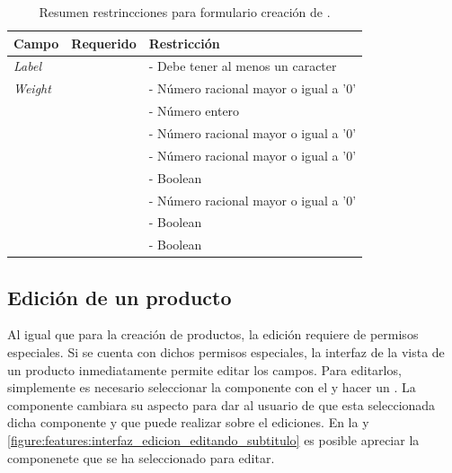 		\begin{table}[H] 
		    \centering
			\begin{tabular}{ |l|c||l| }
				\hline Campo & Requerido & Restricción \\ \hline
				\multirow{1}{*}{\textit{Label}}		&  \multirow{1}{*}{\checkmark} 	& - Debe tener al menos un caracter \\ \hline
				\multirow{1}{*}{\textit{Weight}}	&  \multirow{1}{*}{\checkmark} 	& - Número racional mayor o igual a '0' \\ \hline
				\multirow{1}{*}{\quantityForm}	&  \multirow{1}{*}{\checkmark} 	& - Número entero \\ \hline
				\multirow{1}{*}{\msrpSIGLAS}		&  \multirow{1}{*}{} 			& - Número racional mayor o igual a '0' \\ \hline
				\multirow{1}{*}{\priceForm}		&  \multirow{1}{*}{\checkmark} 	& - Número racional mayor o igual a '0' \\ \hline
				\multirow{1}{*}{\denyForm}		&  \multirow{1}{*}{\checkmark} 	& - Boolean \\ \hline
				\multirow{1}{*}{\warnForm}		&  \multirow{1}{*}{} 			& - Número racional mayor o igual a '0' \\ \hline
				\multirow{1}{*}{\taxableForm}	&  \multirow{1}{*}{\checkmark} 	& - Boolean \\ \hline
				\multirow{1}{*}{\trackingForm}	&  \multirow{1}{*}{\checkmark} 	& - Boolean \\ \hline
			\end{tabular}
		 	\caption{Resumen restrincciones para formulario creación de \optionsForm.}
		    \label{tab:solution:products:create:form:product:generic:options}
		\end{table}

	\subsection{Edición de un producto}\label{chapter:section:productos:subsection:edicion}

		Al igual que para la creación de productos, la edición requiere de permisos especiales. Si se cuenta con dichos permisos especiales, la interfaz de la vista de un producto inmediatamente permite editar los campos. Para editarlos, simplemente es necesario seleccionar la componente con el \mousePC y hacer un \click. La componente cambiara su aspecto para dar \feedback al usuario de que esta seleccionada dicha componente y que puede realizar sobre el ediciones. En la  y \ref{figure:features:interfaz_edicion_editando_subtitulo} es posible apreciar la componenete que se ha seleccionado para editar.


